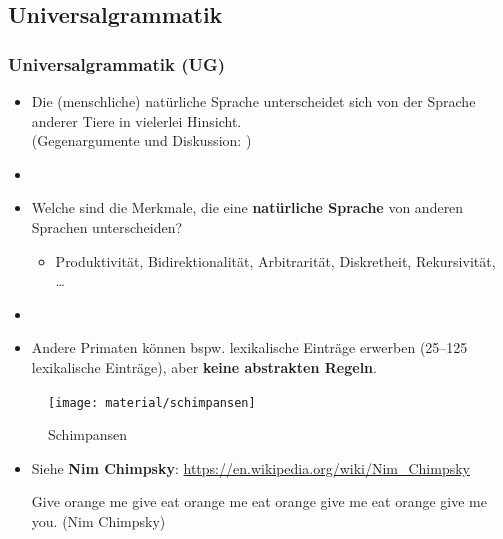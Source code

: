 \subsection{Universalgrammatik}


\begin{frame}
\frametitle{Universalgrammatik (UG)}

\begin{itemize}

	\item Die (menschliche) natürliche Sprache unterscheidet sich von der Sprache anderer Tiere in vielerlei Hinsicht. \citep[vgl. \zB][]{Hockett60x, Pinker95a}\\
	(Gegenargumente und Diskussion: \citealt{Evans&Levinson09a, MuellerS15b})
	\item[]
	\item Welche sind die Merkmale, die eine \textbf{natürliche Sprache} von anderen Sprachen unterscheiden? 
	\begin{itemize}
		\item Produktivität, Bidirektionalität, Arbitrarität, Diskretheit, Rekursivität, \dots\ \citep[vgl.][]{Hockett60x, Luedeling2009}
	\end{itemize}


	\item[]
	\item Andere Primaten können bspw. lexikalische Einträge erwerben (25--125 lexikalische Einträge), aber \textbf{keine abstrakten Regeln}.
\end{itemize}

\end{frame}


\begin{frame}

\begin{figure}
\centering
	\texttt{[image: material/schimpansen]}
	\caption{Schimpansen}
\end{figure}

\begin{itemize}
	\item Siehe \textbf{Nim Chimpsky}: \url{https://en.wikipedia.org/wiki/Nim_Chimpsky}

	\ea Give orange me give eat orange me eat orange give me eat orange give me you. \hfill (Nim Chimpsky)
	\z
\end{itemize}


\end{frame}



